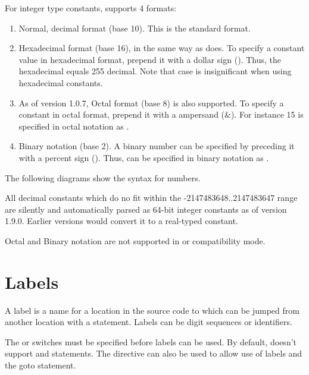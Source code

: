 For integer type constants, \fpc supports 4 formats:
\begin{enumerate}
\item Normal, decimal format (base 10). This is the standard
format.
\item Hexadecimal format (base 16), in the same way as \tp does.
To specify a constant value in hexadecimal format, prepend it with a dollar
sign (\var{\$}). Thus, the hexadecimal  equals 255 decimal.
Note that case is insignificant when using hexadecimal constants.
\item As of version 1.0.7, Octal format (base 8) is also supported.
To specify a constant in octal format, prepend it with a ampersand (\&).
For instance 15 is specified in octal notation as
.
\item Binary notation (base 2). A binary number can be specified
by preceding it with a percent sign (\var{\%}). Thus,  can be
specified in binary notation as .
\end{enumerate}
The following diagrams show the syntax for numbers.


\begin{remark}
All decimal constants which do no fit within the -2147483648..2147483647 range are silently and automatically
parsed as 64-bit integer constants as of version 1.9.0. Earlier
versions would convert it to a real-typed constant.
\end{remark}

\begin{remark}
Octal and Binary notation are not supported in  or  
compatibility mode.
\end{remark}

\section{Labels}
A label is a name for a location in the source code to which can be 
jumped from another location with a  statement. Labels can 
be digit sequences or identifiers.

\begin{remark}
The  or  switches must be specified before 
labels can be used. By default, \fpc doesn't support  and 
 statements. The  directive can also be used
to allow use of labels and the goto statement.
\end{remark}


